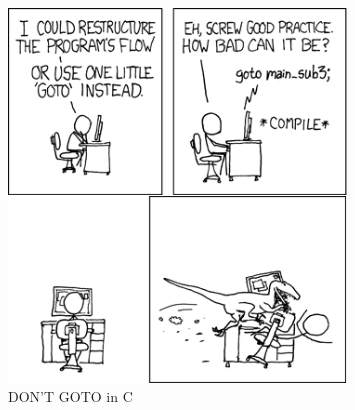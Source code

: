 \newpage
\begin{figure}[bh!]		%
	\begin{centering}
 		\includegraphics[width=0.8\textwidth]{GoToComic.png}
		\caption{DON'T GOTO in C}
	\end{centering}
\end{figure}


